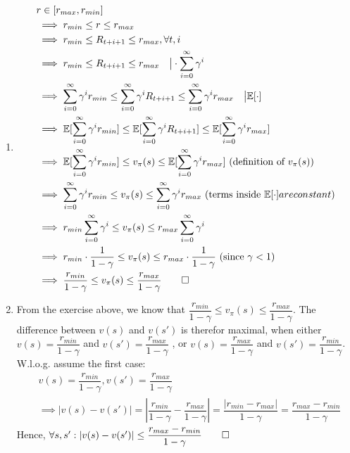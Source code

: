 \documentclass[12pt]{scrartcl}
\begin{document}
\begin{enumerate}
            Therefor, $\max_s|(\mathcal{T}v)(s) - (\mathcal{T}v')(s)| \text{  ($\infty$-norm)} \leq \gamma \left\| v - v' \right\|_\infty$ and the Bellman optimality operator is a $\gamma$-contraction.
      \item \begin{align*}
                  &r \in [r_{max}, r_{min}] \\
                  &\implies r_{min} \leq r \leq r_{max} \\
                  &\implies r_{min} \leq R_{t + i + 1} \leq r_{max}, \forall t, i \\
                  &\implies r_{min} \leq R_{t + i + 1} \leq r_{max} \quad \big| \cdot \sum_{i=0}^\infty \gamma^i \\
                  &\implies \sum_{i=0}^\infty \gamma^i r_{min} \leq \sum_{i=0}^\infty \gamma^i R_{t + i + 1} \leq \sum_{i=0}^\infty \gamma^i r_{max} \quad \big| \mathbb{E}[\cdot] \\
                  &\implies \mathbb{E}[\sum_{i=0}^\infty \gamma^i r_{min}] \leq \mathbb{E}[\sum_{i=0}^\infty \gamma^i R_{t + i + 1}] \leq \mathbb{E}[\sum_{i=0}^\infty \gamma^i r_{max}] \\
                  &\implies \mathbb{E}[\sum_{i=0}^\infty \gamma^i r_{min}] \leq v_\pi(s) \leq \mathbb{E}[\sum_{i=0}^\infty \gamma^i r_{max}] \text{  (definition of $v_\pi(s)$)} \\
                  &\implies \sum_{i=0}^\infty \gamma^i r_{min} \leq v_\pi(s) \leq \sum_{i=0}^\infty \gamma^i r_{max} \text{  (terms inside $\mathbb{E}[\cdot] are constant$)} \\
                  &\implies r_{min} \sum_{i=0}^\infty \gamma^i \leq v_\pi(s) \leq r_{max} \sum_{i=0}^\infty \gamma^i \\
                  &\implies r_{min} \cdot \dfrac{1}{1 - \gamma} \leq v_\pi(s) \leq r_{max} \cdot \dfrac{1}{1 - \gamma} \text{  (since $\gamma < 1$)} \\
                  &\implies \dfrac{r_{min}}{1 - \gamma} \leq v_\pi(s) \leq \dfrac{r_{max}}{1 - \gamma} \qed
            \end{align*}
      \item From the exercise above, we know that $\dfrac{r_{min}}{1 - \gamma} \leq v_\pi(s) \leq \dfrac{r_{max}}{1 - \gamma}$.
            The difference between $v(s)$ and $v(s')$ is therefor maximal, when either $v(s) = \dfrac{r_{min}}{1 - \gamma}$ and $v(s') = \dfrac{r_{max}}{1 - \gamma}$
            , or $v(s) = \dfrac{r_{max}}{1 - \gamma}$ and $v(s') = \dfrac{r_{min}}{1 - \gamma}$. W.l.o.g. assume the first case:
            \begin{align*}
                  &v(s) = \dfrac{r_{min}}{1 - \gamma}, v(s') = \dfrac{r_{max}}{1 - \gamma} \\
                  &\implies \left| v(s) - v(s') \right| = \left| \dfrac{r_{min}}{1 - \gamma} - \dfrac{r_{max}}{1 - \gamma} \right| = \dfrac{\left|r_{min} - r_{max}\right|}{1 - \gamma} = \dfrac{r_{max} - r_{min}}{1 - \gamma} 
            \end{align*}
            Hence, $\forall s, s': \left| v(s) - v(s') \right| \leq \dfrac{r_{max} - r_{min}}{1 - \gamma} \qed$
\end{enumerate}
\end{document}
